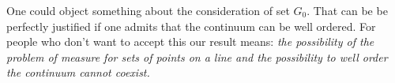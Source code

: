 \documentclass{article}
\begin{document}
\medbreak

One could object something about the consideration of set $G_0$. That can be be perfectly justified if one admits that the continuum can be well ordered. For people who don't want to accept this our result means: {\em the possibility of the problem of measure for sets of points on a line and the possibility to well order the continuum cannot coexist.}
\end{document}
